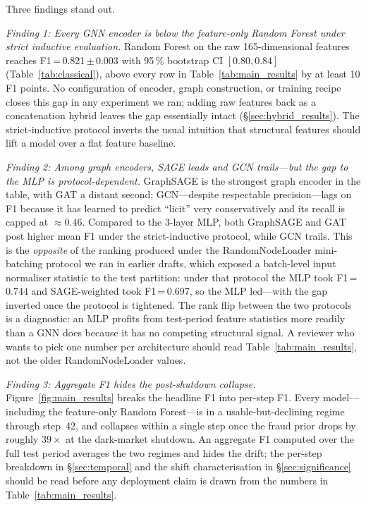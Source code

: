 Three findings stand out.

\textit{Finding 1: Every GNN encoder is below the feature-only
Random Forest under strict inductive evaluation.}  Random Forest on
the raw 165-dimensional features reaches F1\,=\,0.821\,$\pm$\,0.003
with 95\,\% bootstrap CI $[0.80, 0.84]$ (Table~\ref{tab:classical}),
above every row in Table~\ref{tab:main_results} by at least 10 F1
points.  No configuration of encoder, graph construction, or training
recipe closes this gap in any experiment we ran; adding raw features
back as a concatenation hybrid leaves the gap essentially intact
(\S\ref{sec:hybrid_results}).  The strict-inductive protocol inverts
the usual intuition that structural features should lift a model
over a flat feature baseline.

\textit{Finding 2: Among graph encoders, SAGE leads and GCN
trails---but the gap to the MLP is protocol-dependent.}
GraphSAGE is the strongest graph encoder in the table, with
GAT a distant second; GCN---despite respectable precision---lags
on F1 because it has learned to predict ``licit'' very
conservatively and its recall is capped at ${\approx}0.46$.
Compared to the 3-layer MLP, both GraphSAGE and GAT post higher
mean F1 under the strict-inductive protocol, while GCN trails.
This is the \emph{opposite} of the ranking produced under the
RandomNodeLoader mini-batching protocol we ran in earlier drafts,
which exposed a batch-level input normaliser statistic to the test
partition: under that protocol the MLP took F1\,=\,0.744 and
SAGE-weighted took F1\,=\,0.697, so the MLP led---with the gap
inverted once the protocol is tightened.  The rank flip between
the two protocols is a diagnostic: an MLP profits from test-period
feature statistics more readily than a GNN does because it has no
competing structural signal.  A reviewer who wants to pick one
number per architecture should read Table~\ref{tab:main_results},
not the older RandomNodeLoader values.

\textit{Finding 3: Aggregate F1 hides the post-shutdown collapse.}
Figure~\ref{fig:main_results} breaks the headline F1 into per-step
F1.  Every model---including the feature-only Random Forest---is in a
usable-but-declining regime through step~42, and collapses within a
single step once the fraud prior drops by roughly $39\times$ at the
dark-market shutdown.  An aggregate F1 computed over the full test
period averages the two regimes and hides the drift; the per-step
breakdown in \S\ref{sec:temporal} and the shift characterisation in
\S\ref{sec:significance} should be read before any deployment claim
is drawn from the numbers in Table~\ref{tab:main_results}.

